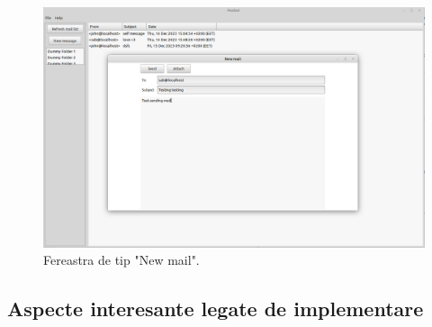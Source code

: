 \documentclass[runningheads]{llncs}
\begin{document}
\begin{figure}
    \centering
    \includegraphics[width=\textwidth]{poshetSend.png}
    \caption{Fereastra de tip "New mail".}
    \label{fig:poshetend}
\end{figure}

\subsection{Aspecte interesante legate de implementare}




\end{document}
